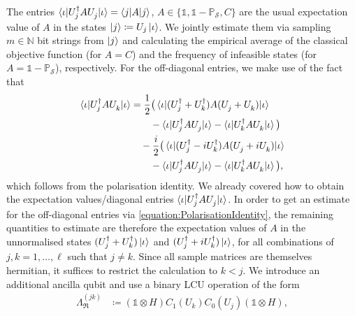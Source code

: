 \documentclass[10pt,conference]{IEEEtran}
\newcommand*{\N}{\mathbb{N}}          %
\newcommand*{\solspace}{\mathcal{S}}  %
\newcommand*{\one}{\mathds{1}}        %
\newcommand*{\projection}{\mathds{P}} %
\begin{document}
The entries $\braket{\iota | U_{j}^{\dagger} A U_{j}^{\vphantom{\dagger}} | \iota} = \braket{j | A | j}$, $A \in \{\one, \one - \projection_{\solspace}, C\}$ are the usual expectation value of $A$ in the states $\ket{j} \coloneqq U_{j} \ket{\iota}$.
We jointly estimate them via sampling $m \in \N$ bit strings from $\ket{j}$ and calculating the empirical average of the classical objective function (for $A = C$) and the frequency of infeasible states (for $A = \one - \projection_{\solspace}$), respectively.
For the off-diagonal entries, we make use of the fact that
\begin{align}\label{equation:PolarisationIdentity}
    \begin{split}
        \braket{\iota | U_{j}^{\dagger} A U_{k}^{\vphantom{\dagger}} | \iota} &= \frac{1}{2} \big(\braket{\iota | (U_{j}^{\dagger} + U_{k}^{\dagger}) A (U_{j}^{\vphantom{\dagger}} + U_{k}^{\vphantom{\dagger}}) | \iota} \\
        &\quad\quad - \braket{\iota | U_{j}^{\dagger} A U_{j}^{\vphantom{\dagger}} | \iota} - \braket{\iota | U_{k}^{\dagger} A U_{k}^{\vphantom{\dagger}} | \iota}\big) \\
        &\quad - \frac{i}{2} \big(\braket{\iota | (U_{j}^{\dagger} - i U_{k}^{\dagger}) A (U_{j}^{\vphantom{\dagger}} + i U_{k}^{\vphantom{\dagger}}) | \iota} \\
        &\quad\quad - \braket{\iota | U_{j}^{\dagger} A U_{j}^{\vphantom{\dagger}} | \iota} - \braket{\iota | U_{k}^{\dagger} A U_{k}^{\vphantom{\dagger}} | \iota}\big),
    \end{split}
\end{align}
which follows from the polarisation identity.
We already covered how to obtain the expectation values/diagonal entries $\braket{\iota | U_{j}^{\dagger} A U_{j}^{\vphantom{\dagger}} | \iota}$.
In order to get an estimate for the off-diagonal entries via \eqref{equation:PolarisationIdentity}, the remaining quantities to estimate are therefore the expectation values of $A$ in the unnormalised states $(U_{j}^{\dagger} + U_{k}^{\dagger}) \ket{\iota}$ and $(U_{j}^{\dagger} + i U_{k}^{\dagger}) \ket{\iota}$, for all combinations of $j, k = 1, \ldots, \ell$ such that $j \neq k$.
Since all sample matrices are themselves hermitian, it suffices to restrict the calculation to $k < j$.
We introduce an additional ancilla qubit and use a binary LCU operation of the form
\begin{align*}
    \Lambda_{\Re}^{(j k)} &\coloneqq (\one \otimes H) C_{1}(U_{k}) C_{0}(U_{j}) (\one \otimes H),
\end{align*}
\end{document}
